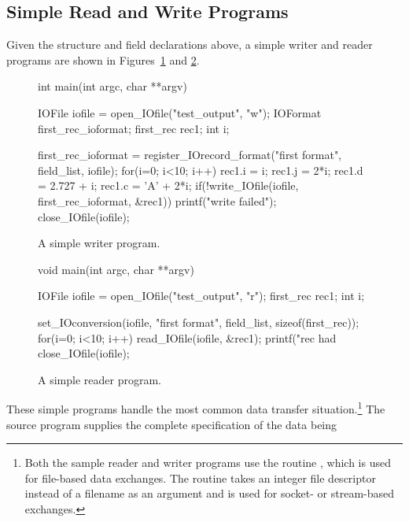 \subsection{Simple Read and Write Programs\label{sec:simple}}
Given the structure and field declarations above, a simple writer and reader
programs are shown in Figures~\ref{writer} and \ref{reader}.
\begin{figure}[bt]
\begin{Code}
int main(int argc, char **argv)
{
    IOFile iofile = open_IOfile("test_output", "w");
    IOFormat first_rec_ioformat;
    first_rec rec1;
    int i;

    first_rec_ioformat = register_IOrecord_format("first format", field_list, iofile);
    for(i=0; i<10; i++) {
        rec1.i = i;  rec1.j = 2*i; rec1.d = 2.727 + i; rec1.c = 'A' + 2*i;
        if(!write_IOfile(iofile, first_rec_ioformat, &rec1)) {
           printf("write failed\n");
        }
    }
    close_IOfile(iofile);
}
\end{Code}
\vspace*{-.25in}
\caption{A simple writer program.\label{writer}}

\end{figure}
\begin{figure}[tbh]
\begin{Code}
void main(int argc, char **argv)
{
    IOFile iofile = open_IOfile("test_output", "r");
    first_rec rec1;
    int i;

    set_IOconversion(iofile, "first format", field_list, sizeof(first_rec));
    for(i=0; i<10; i++) {
        read_IOfile(iofile, &rec1);
        printf("rec had %
    }
    close_IOfile(iofile);
}
\end{Code}
\vspace*{-.25in}
\caption{A simple reader program.\label{reader}}
\end{figure}
These simple programs handle the most common data transfer
situation.\footnote{Both the sample reader and writer programs use the routine
, which is used for file-based data exchanges.  The routine
 takes an integer file descriptor instead of a filename as an
argument and is used for socket- or stream-based exchanges.}  
The source program supplies the complete specification of the data being
